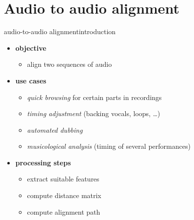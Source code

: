     \section[A2A]{Audio to audio alignment}
        \begin{frame}{audio-to-audio alignment}{introduction}
            \begin{itemize}
                \item	\textbf{objective}
                    \begin{itemize}
                        \item	align two sequences of audio
                    \end{itemize}
                \bigskip
                \item<2->	\textbf{use cases}
                    \begin{itemize}
                        \item	\textit{quick browsing} for certain parts in recordings
                        \item	\textit{timing adjustment} (backing vocals, loops, \ldots)
                        \item	\textit{automated dubbing}
                        \item	\textit{musicological analysis} (timing of several performances)
                    \end{itemize}
                \bigskip
                \item<3->	\textbf{processing steps}
                    \begin{itemize}
                        \item	extract suitable features
                        \item	compute distance matrix
                        \item	compute alignment path
                    \end{itemize}
            \end{itemize}
        \end{frame}

